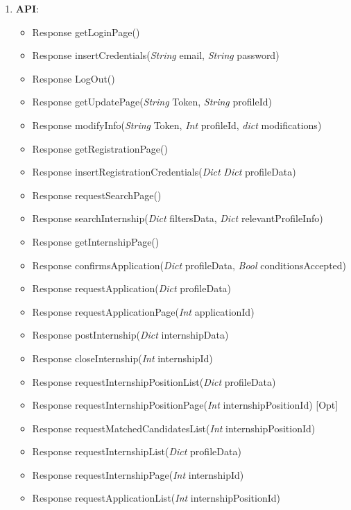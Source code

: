 \begin{enumerate}

    \item \textbf{API}: 
        \begin{itemize}
            \item Response getLoginPage()
            \item Response insertCredentials(\textit{String} email, \textit{String} password)
            \item Response LogOut()
            \item Response getUpdatePage(\textit{String} Token, \textit{String} profileId)
            \item Response modifyInfo(\textit{String} Token, \textit{Int} profileId, \textit{dict} modifications)
            \item Response getRegistrationPage()
            \item Response insertRegistrationCredentials(\textit{Dict} \textit{Dict} profileData)
            \item Response requestSearchPage()
            \item Response searchInternship(\textit{Dict} filtersData, \textit{Dict} relevantProfileInfo)
            \item Response getInternshipPage()
            \item Response confirmsApplication(\textit{Dict} profileData, \textit{Bool} conditionsAccepted)
            \item Response requestApplication(\textit{Dict} profileData)
            \item Response requestApplicationPage(\textit{Int} applicationId)
            \item Response postInternship(\textit{Dict} internshipData)
            \item Response closeInternship(\textit{Int} internshipId)
            \item Response requestInternshipPositionList(\textit{Dict} profileData)
            \item Response requestInternshipPositionPage(\textit{Int} internshipPositionId)
            [Opt]\item Response requestMatchedCandidatesList(\textit{Int} internshipPositionId)
            \item Response requestInternshipList(\textit{Dict} profileData)
            \item Response requestInternshipPage(\textit{Int} internshipId)
            \item Response requestApplicationList(\textit{Int} internshipPositionId)

\end{itemize}
\end{enumerate}
